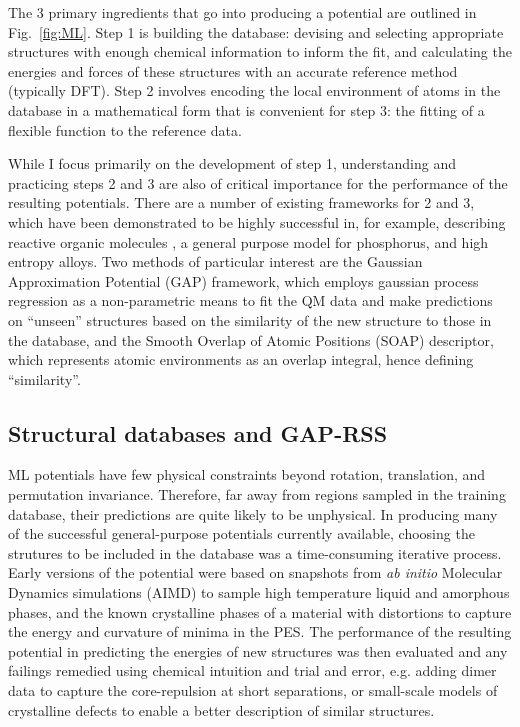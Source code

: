 \documentclass[12pt,a4paper,twoside,nobind]{ociamthesis}
\begin{document}
The 3 primary ingredients that go into producing a potential are outlined in Fig.\ \ref{fig:ML}.
Step 1 is building the database:
devising and selecting appropriate structures with enough chemical information to inform the fit,
and calculating the energies and forces of these structures with an accurate reference method (typically DFT).
Step 2 involves encoding the 
local environment of atoms in the database in a mathematical form that is convenient for step 3: the fitting of a flexible function to the reference data.

While I focus primarily on the development of step 1, understanding and practicing steps 2 and 3 are also of critical importance for the performance of the resulting potentials.
There are a number of existing frameworks for 2 and 3, which have been demonstrated to be highly successful in, for example,
describing reactive organic molecules \cite{Ko2021a}, a general purpose model for phosphorus\cite{Deringer2020c}, and  high entropy alloys\cite{Kostiuchenko2019}. 
Two methods of particular interest are the Gaussian Approximation Potential (GAP) framework\cite{Bartok2010}, which employs gaussian process regression as a non-parametric means
to fit the QM data and make predictions on ``unseen'' structures based on the similarity of the new structure to those in the database,
and the Smooth Overlap of Atomic Positions (SOAP) descriptor\cite{Bartok2013}, which represents atomic environments as an overlap integral, hence defining ``similarity''.

\subsection*{Structural databases and GAP-RSS}

ML potentials have few physical constraints beyond rotation, translation, and permutation invariance.
Therefore, far away from regions sampled in the training database, their predictions are quite likely to be unphysical.
In producing many of the successful general-purpose potentials currently available, choosing the strutures to be included in the database was a time-consuming iterative process.
Early versions of the potential were based on snapshots from \textit{ab initio} Molecular Dynamics simulations (AIMD) to sample high temperature liquid and amorphous phases, and
the known crystalline phases of a material with distortions to capture the energy and curvature of minima in the PES. The performance of the resulting potential in predicting the energies
of new structures was then evaluated and any failings remedied using chemical intuition and trial and error, e.g. adding dimer data to capture the core-repulsion at short separations,
or small-scale models of crystalline defects to enable a better description of similar structures. 
\end{document}
